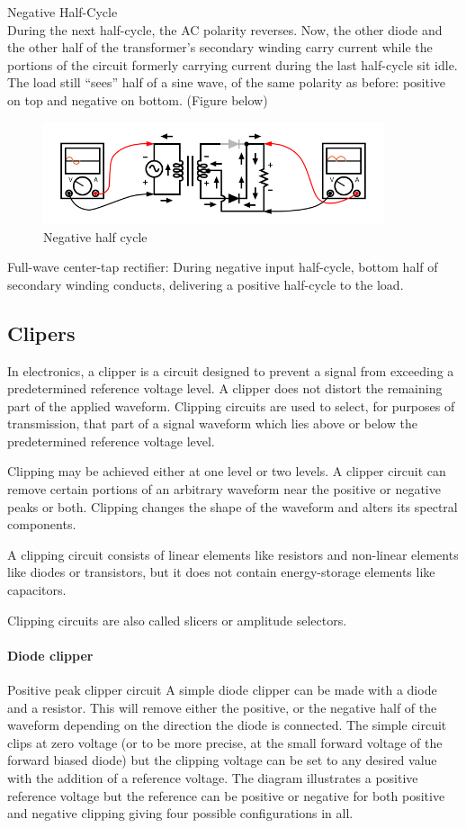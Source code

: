\documentclass{article}
\begin{document}
	{\large Negative Half-Cycle}\\
During the next half-cycle, the AC polarity reverses. Now, the other diode and the other half of the transformer’s secondary winding carry current while the portions of the circuit formerly carrying current during the last half-cycle sit idle. The load still “sees” half of a sine wave, of the same polarity as before: positive on top and negative on bottom. (Figure below)
	\begin{figure}[H]
		\centering
		\includegraphics[height=3cm]{full-wave-center-tap-rectifier-negative-half-cycle.jpg}
		\caption{Negative half cycle}
	\end{figure}

Full-wave center-tap rectifier: During negative input half-cycle, bottom half of secondary winding conducts, delivering a positive half-cycle to the load.
	\subsection{Clipers}
	In electronics, a clipper is a circuit designed to prevent a signal from exceeding a predetermined reference voltage level. A clipper does not distort the remaining part of the applied waveform. Clipping circuits are used to select, for purposes of transmission, that part of a signal waveform which lies above or below the predetermined reference voltage level.

Clipping may be achieved either at one level or two levels. A clipper circuit can remove certain portions of an arbitrary waveform near the positive or negative peaks or both. Clipping changes the shape of the waveform and alters its spectral components.

A clipping circuit consists of linear elements like resistors and non-linear elements like diodes or transistors, but it does not contain energy-storage elements like capacitors.

Clipping circuits are also called slicers or amplitude selectors.


\paragraph{\large Diode clipper\\}
Positive peak clipper circuit
A simple diode clipper can be made with a diode and a resistor. This will remove either the positive, or the negative half of the waveform depending on the direction the diode is connected. The simple circuit clips at zero voltage (or to be more precise, at the small forward voltage of the forward biased diode) but the clipping voltage can be set to any desired value with the addition of a reference voltage. The diagram illustrates a positive reference voltage but the reference can be positive or negative for both positive and negative clipping giving four possible configurations in all.
\end{document}
